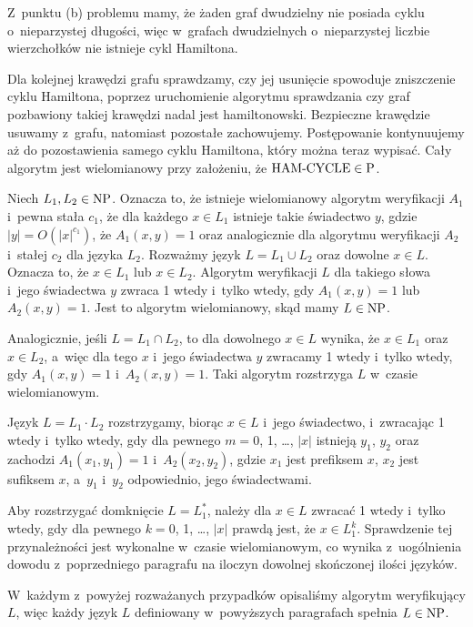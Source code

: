 \exercise %
Z~punktu (b) problemu  mamy, że żaden graf dwudzielny nie posiada cyklu o~nieparzystej długości, więc w~grafach dwudzielnych o~nieparzystej liczbie wierzchołków nie istnieje cykl Hamiltona.

\exercise %
Dla kolejnej krawędzi grafu sprawdzamy, czy jej usunięcie spowoduje zniszczenie cyklu Hamiltona, poprzez uruchomienie algorytmu sprawdzania czy graf pozbawiony takiej krawędzi nadal jest hamiltonowski.
Bezpieczne krawędzie usuwamy z~grafu, natomiast pozostałe zachowujemy.
Postępowanie kontynuujemy aż do pozostawienia samego cyklu Hamiltona, który można teraz wypisać.
Cały algorytm jest wielomianowy przy założeniu, że $\text{HAM-CYCLE}\in\text{P}$.

\exercise %
Niech $L_1,L_2\in\text{NP}$.
Oznacza to, że istnieje wielomianowy algorytm weryfikacji $A_1$ i~pewna stała $c_1$, że dla każdego $x\in L_1$ istnieje takie świadectwo $y$, gdzie $|y|=O(|x|^{c_1})$, że $A_1(x,y)=1$ oraz analogicznie dla algorytmu weryfikacji $A_2$ i~stałej $c_2$ dla języka $L_2$.
Rozważmy język $L=L_1\cup L_2$ oraz dowolne $x\in L$.
Oznacza to, że $x\in L_1$ lub $x\in L_2$.
Algorytm weryfikacji $L$ dla takiego słowa i~jego świadectwa $y$ zwraca 1 wtedy i~tylko wtedy, gdy $A_1(x,y)=1$ lub $A_2(x,y)=1$.
Jest to algorytm wielomianowy, skąd mamy $L\in\text{NP}$.

Analogicznie, jeśli $L=L_1\cap L_2$, to dla dowolnego $x\in L$ wynika, że $x\in L_1$ oraz $x\in L_2$, a~więc dla tego $x$ i~jego świadectwa $y$ zwracamy 1 wtedy i~tylko wtedy, gdy $A_1(x,y)=1$ i~$A_2(x,y)=1$.
Taki algorytm rozstrzyga $L$ w~czasie wielomianowym.

Język $L=L_1\cdot L_2$ rozstrzygamy, biorąc $x\in L$ i~jego świadectwo, i~zwracając 1 wtedy i~tylko wtedy, gdy dla pewnego $m=0$, 1, \dots, $|x|$ istnieją $y_1$, $y_2$ oraz zachodzi $A_1(x_1,y_1)=1$ i~$A_2(x_2,y_2)$, gdzie $x_1$ jest  prefiksem $x$, $x_2$ jest  sufiksem $x$, a~$y_1$ i~$y_2$ odpowiednio, jego świadectwami.

Aby rozstrzygać domknięcie $L=L_1^*$, należy dla $x\in L$ zwracać 1 wtedy i~tylko wtedy, gdy dla pewnego $k=0$, 1, \dots, $|x|$ prawdą jest, że $x\in L_1^k$.
Sprawdzenie tej przynależności jest wykonalne w~czasie wielomianowym, co wynika z~uogólnienia dowodu z~poprzedniego paragrafu na iloczyn dowolnej skończonej ilości języków.

W~każdym z~powyżej rozważanych przypadków opisaliśmy algorytm weryfikujący $L$, więc każdy język $L$ definiowany w~powyższych paragrafach spełnia $L\in\text{NP}$.

